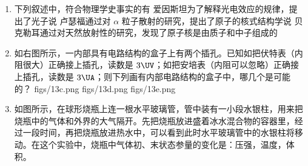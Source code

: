 \documentclass[\gkver]{gaokaozhenti}
\begin{document}
\begin{enumerate}

\item
下列叙述中，符合物理学史事实的有
{爱因斯坦为了解释光电效应的规律，提出了光子说}
{卢瑟福通过对 $\alpha$ 粒子散射的研究，提出了原子的核式结构学说}
{贝克勒耳通过对天然放射性的研究，发现了原子核是由质子和中子组成的}


\item
如右图所示，一内部具有电路结构的盒子上有两个插孔。已知如把伏特表（内阻很大）正确接上插孔，读数是 $3\UV$；如把安培表（内阻可以忽略）正确接上插孔，读数是 $3\UA$；则下列画有内部电路结构的盒子中，哪几个是可能的？
\onepicture[align=right, w=4.5cm]{}
{figs/13c.png}
{figs/13d.png}
{figs/13e.png}


\item
如图所示，在球形烧瓶上连一根水平玻璃管，管中装有一小段水银柱，用来把烧瓶中的气体和外界的大气隔开。先把烧瓶放进盛着冰水混合物的容器里，经过一段时间，再把烧瓶放进热水中，可以看到此时水平玻璃管中的水银柱将移动。在这个实验中，烧瓶中气体初、末状态参量的变化是：压强，温度，体积。
\onepicture[align=right, w=6cm]{}




\end{enumerate}
\end{document}
